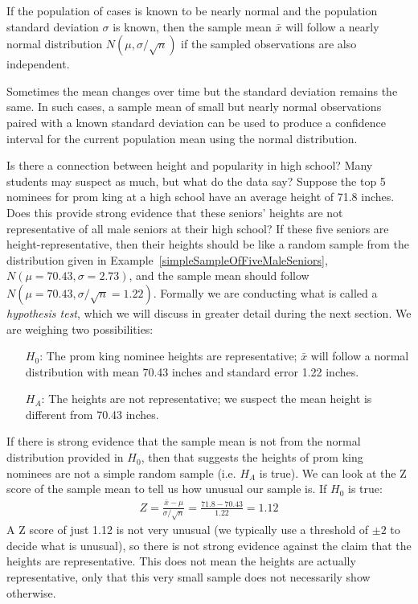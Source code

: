\begin{termBox}{
If the population of cases is known to be nearly normal and the population standard deviation $\sigma$ is known, then the sample mean $\bar{x}$ will follow a nearly normal distribution $N(\mu, \sigma/\sqrt{n})$ if the sampled observations are also independent.}
\end{termBox}

Sometimes the mean changes over time but the standard deviation remains the same. In such cases, a sample mean of small but nearly normal observations paired with a known standard deviation can be used to produce a confidence interval for the current population mean using the normal distribution.

\begin{example}{Is there a connection between height and popularity in high school? Many students may suspect as much, but what do the data say? Suppose the top 5 nominees for prom king at a high school have an average height of 71.8 inches. Does this provide strong evidence that these seniors' heights are not representative of all male seniors at their high school?}
If these five seniors are height-representative, then their heights should be like a random sample from the distribution given in Example~\ref{simpleSampleOfFiveMaleSeniors}, $N\left(\mu=70.43, \sigma = 2.73\right)$, and the sample mean should follow $N\left(\mu=70.43, \sigma/\sqrt{n} = 1.22\right)$. Formally we are conducting what is called a \emph{hypothesis test}, which we will discuss in greater detail during the next section. We are weighing two possibilities:
\begin{itemize}
\setlength{\itemsep}{0mm}
\item[$H_0$:] The prom king nominee heights are representative; $\bar{x}$ will follow a normal distribution with mean 70.43 inches and standard error 1.22 inches.
\item[$H_A$:] The heights are not representative; we suspect the mean height is different from 70.43 inches.
\end{itemize}
If there is strong evidence that the sample mean is not from the normal distribution provided in $H_0$, then that suggests the heights of prom king nominees are not a simple random sample (i.e. $H_A$ is true). We can look at the Z score of the sample mean to tell us how unusual our sample is. If $H_0$ is true:
\begin{align*}
Z = \frac{\bar{x} - \mu}{\sigma/\sqrt{n}} = \frac{71.8 - 70.43}{1.22} = 1.12
\end{align*}
A Z score of just 1.12 is not very unusual (we typically use a threshold of $\pm2$ to decide what is unusual), so there is not strong evidence against the claim that the heights are representative. This does not mean the heights are actually representative, only that this very small sample does not necessarily show otherwise.
\end{example}

